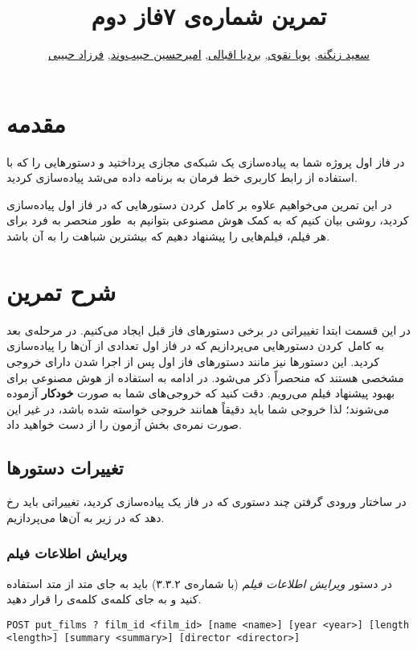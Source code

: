 \documentclass{utap}
\title{تمرین شماره‌ی ۷\normalsize\qquad فاز دوم}
\author{%
    \href{mailto:zangenehsaeed412@gmail.com?subject=[AP\%20S98\%20A7]\%20}{سعید زنگنه},
    \href{mailto:naghavi.pooya@gmail.com?subject=[AP\%20S98\%20A7]\%20}{پویا نقوی},
    \href{mailto:bardia.eghbali@gmail.com?subject=[AP\%20S98\%20A7]\%20}{بردیا اقبالی},
    \href{mailto:ahhabibvand@gmail.com?subject=[AP\%20S98\%20A7]\%20}{امیرحسین حبیب‌وند},
    \href{mailto:farzadhabibii98@gmail.com?subject=[AP\%20S98\%20A7]\%20}{فرزاد حبیبی}
}
\begin{document}
    \maketitle

    \section{مقدمه}

    در فاز اول پروژه شما به پیاده‌سازی یک شبکه‌ی مجازی پرداختید و دستورهایی را که با استفاده از رابط کاربری خط فرمان به برنامه داده می‌شد پیاده‌سازی کردید.

    در این تمرین می‌خواهیم علاوه بر کامل~کردن دستورهایی که در فاز اول پیاده‌سازی کردید، روشی بیان کنیم که به کمک هوش مصنوعی بتوانیم به~طور منحصر به فرد برای هر فیلم، فیلم‌هایی را پیشنهاد دهیم که بیشترین شباهت را به آن باشد.

    \section{شرح تمرین}

    در این قسمت ابتدا تغییراتی در برخی دستورهای فاز قبل ایجاد می‌کنیم.
    در مرحله‌ی بعد به کامل~کردن دستورهایی می‌پردازیم که در فاز اول تعدادی از آن‌ها را پیاده‌سازی کردید. این دستورها نیز مانند دستورهای فاز اول پس از اجرا شدن دارای خروجی مشخصی هستند که منحصراً ذکر می‌شود.
    در ادامه به استفاده از هوش مصنوعی برای بهبود پیشنهاد فیلم می‌رویم.
    دقت کنید که خروجی‌های شما به صورت \textbf{خودکار} آزموده می‌شوند؛ لذا خروجی شما باید دقیقاً همانند خروجی خواسته شده باشد، در غیر این صورت نمره‌ی بخش آزمون را از دست خواهید داد.

    \subsection{تغییرات دستورها}

    در ساختار ورودی گرفتن چند دستوری که در فاز یک پیاده‌سازی کردید، تغییراتی باید رخ دهد که در زیر به آن‌ها می‌پردازیم.

    \subsubsection{ویرایش اطلاعات فیلم}

    در دستور \textit{ویرایش اطلاعات فیلم} (با شماره‌ی ۳.۳.۲) باید به‌ جای متد  از متد  استفاده کنید و به‌ جای کلمه‌ی  کلمه‌ی  را قرار دهید.
    \begin{latin}
        \scriptsize
        \begin{Verbatim}[frame=lines,label={\rl{دستور ورودی}}]
POST put_films ? film_id <film_id> [name <name>] [year <year>] [length <length>] [summary <summary>] [director <director>]
        \end{Verbatim}
    \end{latin}
\end{document}
